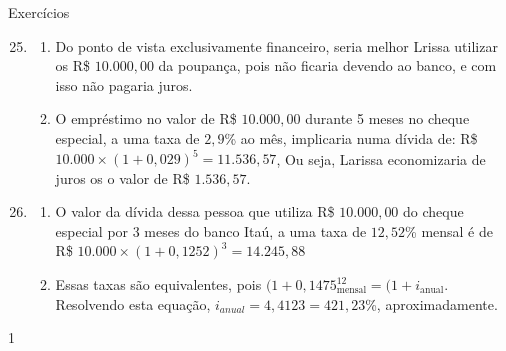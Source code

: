 \begin{resposta}{Exercícios}
{
  \begin{enumerate}\setcounter{enumi}{24}
    \item 
    \begin{enumerate}
      \item Do ponto de vista exclusivamente financeiro, seria melhor Lrissa utilizar os R\$ $10.000{,}00$ da poupança, pois não ficaria devendo ao banco, e com isso não pagaria juros.

      \item O empréstimo no valor de R\$ $10.000{,}00$ durante 5 meses no cheque especial, a uma taxa de $2{,}9$\% ao mês, implicaria numa dívida de: R\$ $10.000\times(1+0{,}029)^5=11.536{,}57$, Ou seja, Larissa economizaria de juros os o valor de R\$ $1.536{,}57$.
    \end{enumerate}
    \item
    \begin{enumerate}
      \item O valor da dívida dessa pessoa que utiliza R\$ $10.000{,}00$ do cheque especial por 3 meses do banco Itaú, a uma taxa de $12{,}52$\% mensal é de R\$ $10.000\times (1+0{,}1252)^3=14.245{,}88$
      \item Essas taxas são equivalentes, pois $(1+0{,}1475_{\text{mensal}}^{12}=(1+i_{\text{anual}}$. Resolvendo esta equação, $i_{anual}=4{,}4123=421{,}23$\%, aproximadamente.
    \end{enumerate}
    

  \end{enumerate}
}{1}
\end{resposta}

